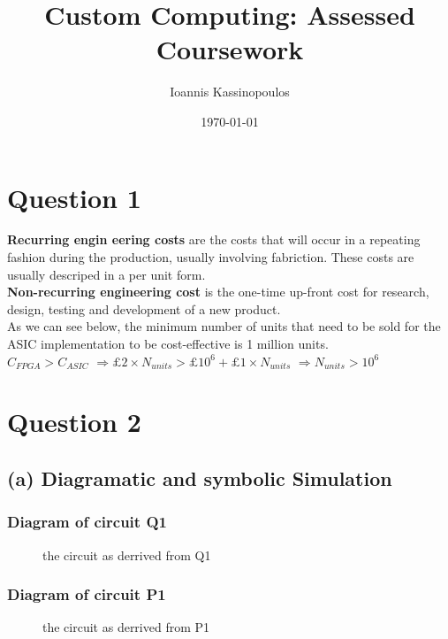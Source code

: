 \documentclass[a4paper,10pt]{article}
\begin{document}
\title{Custom Computing: Assessed Coursework}
\author{Ioannis Kassinopoulos}
\date{\today}
\maketitle
\section*{Question 1}
\textbf{Recurring engin
eering costs} are the costs that will occur in a repeating fashion during the production, usually involving fabriction.
These costs are usually descriped in a per unit form.
\\[0.25cm]
\textbf{Non-recurring engineering cost} is the one-time up-front cost 
for research, design, testing and development of a new product.
\\[0.25cm]
As we can see below, the minimum number of units that need to be sold for the ASIC implementation to be cost-effective is 1 million units.
\\[0.25cm]
$C_{FPGA} > C_{ASIC}$
$\Rightarrow \pounds 2 \times N_{units} > \pounds 10^6 + \pounds 1 \times N_{units} $ 
$\Rightarrow N_{units} > 10^6$

\section*{Question 2}
\subsection*{(a) Diagramatic and symbolic Simulation}
\subsubsection*{Diagram of circuit Q1}
\begin{figure}[!h]
\begin{center}

\caption{the circuit as derrived from Q1}
\end{center}
\end{figure}
\subsubsection*{Diagram of circuit P1}
\begin{figure}[!h]
\begin{center}

\caption{the circuit as derrived from P1}
\end{center}
\end{figure}
\end{document}
